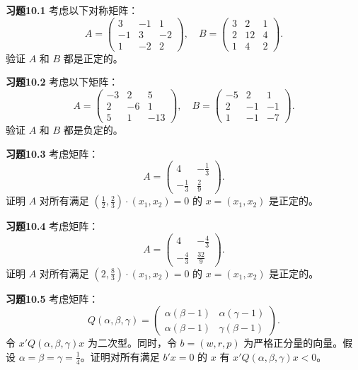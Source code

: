 \begin{translation}
\textbf{习题10.1} 考虑以下对称矩阵：
\[
A = \begin{pmatrix} 3 & -1 & 1 \\ -1 & 3 & -2 \\ 1 & -2 & 2 \end{pmatrix}, \quad
B = \begin{pmatrix} 3 & 2 & 1 \\ 2 & 12 & 4 \\ 1 & 4 & 2 \end{pmatrix}.
\]
验证 $A$ 和 $B$ 都是正定的。

\textbf{习题10.2} 考虑以下矩阵：
\[
A = \begin{pmatrix} -3 & 2 & 5 \\ 2 & -6 & 1 \\ 5 & 1 & -13 \end{pmatrix}, \quad
B = \begin{pmatrix} -5 & 2 & 1 \\ 2 & -1 & -1 \\ 1 & -1 & -7 \end{pmatrix}.
\]
验证 $A$ 和 $B$ 都是负定的。

\textbf{习题10.3} 考虑矩阵：
\[
A = \begin{pmatrix} 4 & -\frac{1}{3} \\ -\frac{1}{3} & \frac{2}{9} \end{pmatrix}.
\]
证明 $A$ 对所有满足 $(\frac{1}{2}, \frac{2}{3}) \cdot (x_1, x_2) = 0$ 的 $x = (x_1, x_2)$ 是正定的。

\textbf{习题10.4} 考虑矩阵：
\[
A = \begin{pmatrix} 4 & -\frac{4}{3} \\ -\frac{4}{3} & \frac{32}{9} \end{pmatrix}.
\]
证明 $A$ 对所有满足 $(2, \frac{8}{3}) \cdot (x_1, x_2) = 0$ 的 $x = (x_1, x_2)$ 是正定的。

\textbf{习题10.5} 考虑矩阵：
\[
Q(\alpha, \beta, \gamma) = \begin{pmatrix}
\alpha(\beta-1) & \alpha(\gamma-1) \\
\alpha(\beta-1) & \gamma(\beta-1)
\end{pmatrix}.
\]
令 $x'Q(\alpha,\beta,\gamma)x$ 为二次型。同时，令 $b = (w, r, p)$ 为严格正分量的向量。假设 $\alpha = \beta = \gamma = \frac{1}{4}$。证明对所有满足 $b'x = 0$ 的 $x$ 有 $x'Q(\alpha,\beta,\gamma)x < 0$。
\end{translation}


